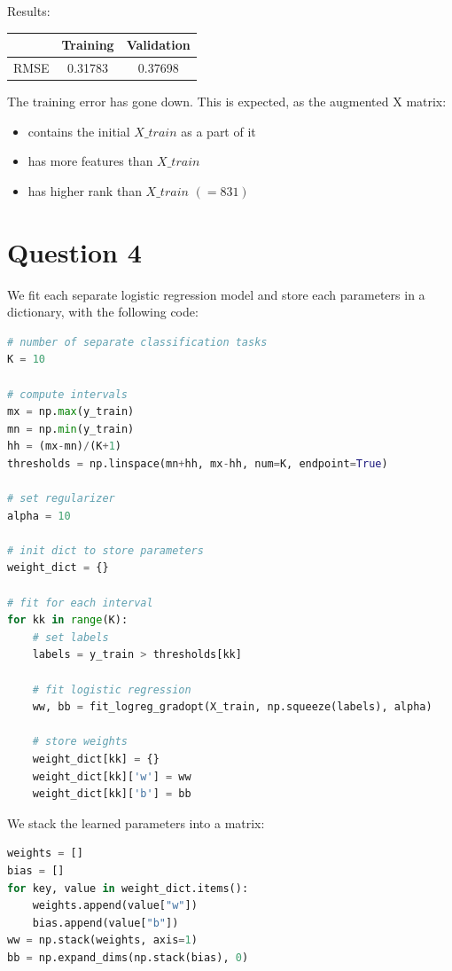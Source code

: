 \documentclass{article}
\begin{document}
Results:

\begin{center}
\begin{tabular}{ | c | c | c | }
\hline
 & Training & Validation \\
\hline
RMSE & 0.31783 & 0.37698 \\ 
\hline
\end{tabular}
\end{center}

The training error has gone down. This is expected, as the augmented X matrix:
\begin{itemize}
    \item contains the initial $X\_train$ as a part of it
    \item has more features than $X\_train$
    \item has higher rank than $X\_train$ $(=831)$
    
\end{itemize}


\section*{Question 4}

We fit each separate logistic regression model and store each parameters in a dictionary, with the following code:

\begin{lstlisting}[language=Python]
# number of separate classification tasks
K = 10 

# compute intervals
mx = np.max(y_train)
mn = np.min(y_train)
hh = (mx-mn)/(K+1)
thresholds = np.linspace(mn+hh, mx-hh, num=K, endpoint=True)

# set regularizer
alpha = 10 

# init dict to store parameters
weight_dict = {}

# fit for each interval
for kk in range(K):
    # set labels
    labels = y_train > thresholds[kk]

    # fit logistic regression
    ww, bb = fit_logreg_gradopt(X_train, np.squeeze(labels), alpha)
    
    # store weights
    weight_dict[kk] = {}
    weight_dict[kk]['w'] = ww
    weight_dict[kk]['b'] = bb
\end{lstlisting}

We stack the learned parameters into a matrix:

\begin{lstlisting}[language=Python]
weights = []
bias = []
for key, value in weight_dict.items():
    weights.append(value["w"])
    bias.append(value["b"])
ww = np.stack(weights, axis=1)
bb = np.expand_dims(np.stack(bias), 0)
\end{lstlisting}
\end{document}
